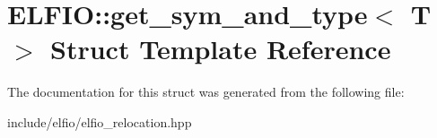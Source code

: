 \hypertarget{struct_e_l_f_i_o_1_1get__sym__and__type}{}\section{E\+L\+F\+IO\+:\+:get\+\_\+sym\+\_\+and\+\_\+type$<$ T $>$ Struct Template Reference}
\label{struct_e_l_f_i_o_1_1get__sym__and__type}


The documentation for this struct was generated from the following file\+:\begin{DoxyCompactItemize}
\item 
include/elfio/elfio\+\_\+relocation.\+hpp\end{DoxyCompactItemize}
